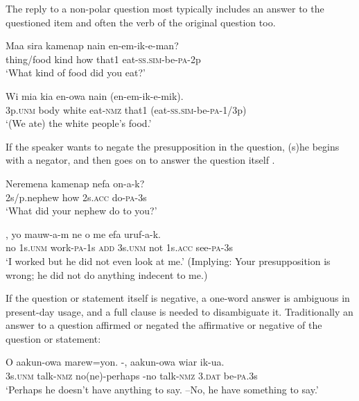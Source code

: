 The reply to a non-polar question most typically includes an answer to the questioned item and often the verb of the original question too.

\ea%
\label{ex:x1221}
\gll Maa  sira  kamenap  nain  en-em-ik-e-man? \\
thing/food  kind  how  that1  eat-\textsc{ss}.\textsc{sim}-be-\textsc{pa}-2p      \\
\glt `What kind of food did you eat?'
\z





\ea%
\label{ex:x1222}
\gll Wi  mia  kia  en-owa  nain  (en-em-ik-e-mik). \\
3p.\textsc{unm}  body  white  eat-\textsc{nmz}  that1  (eat-\textsc{ss}.\textsc{sim}-be-\textsc{pa}-1/3p)      \\
\glt `(We ate) the white people's food.'
\z





If the speaker wants to negate the presupposition in the question, (s)he begins with a negator, and then goes on to answer the question itself .

\ea%
\label{ex:x1223}
\gll Neremena  kamenap  nefa  on-a-k? \\
2s/p.nephew  how  2s.\textsc{acc}  do-\textsc{pa}-3s      \\
\glt `What did your nephew do to you?'
\z





\ea%
\label{ex:x1224}
\gll {},  yo  mauw-a-m  ne  o  me  efa  uruf-a-k.\\
no  1s.\textsc{unm}  work-\textsc{pa}-1s  \textsc{add}  3s.\textsc{unm}  not  1s.\textsc{acc}  see-\textsc{pa}-3s     \\
\glt `I worked but he did not even look at me.' (Implying: Your presupposition is wrong; he did not do anything indecent to me.)
\z

 
If the question or statement itself is negative, a one-word answer is ambiguous in present-day usage, and a full clause is needed to disambiguate it. Traditionally an answer to a question affirmed or negated the affirmative or negative  of the question or statement:

\ea%
\label{ex:x1151}
\gll O  aakun-owa  marew=yon.  -,  aakun-owa  wiar  ik-ua.\\
3s.\textsc{unm}  talk-\textsc{nmz}  no(ne)-perhaps  -no  talk-\textsc{nmz}  3.\textsc{dat} be-\textsc{pa}.3s     \\
\glt `Perhaps he doesn't have anything to say. --No, he  have something to say.'
\z









